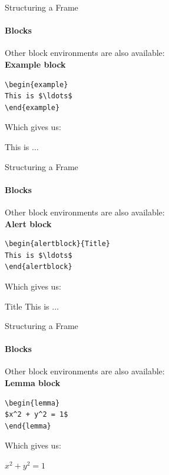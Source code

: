 \documentclass{bredelebeamer}
\begin{document}
\begin{frame}[fragile]{Structuring a Frame}\framesubtitle{Blocks}
Other block environments are also available:\\
\textbf{Example block}	
\begin{center}
\begin{verbatim}
\begin{example}
This is $\ldots$
\end{example}
\end{verbatim}
\end{center}
\alert{Which gives us}:\\
\begin{example}
This is $\ldots$
\end{example}
\end{frame}

\begin{frame}[fragile]{Structuring a Frame}\framesubtitle{Blocks}
Other block environments are also available:\\
\textbf{Alert block}	
\begin{center}
\begin{verbatim}
\begin{alertblock}{Title}
This is $\ldots$
\end{alertblock}
\end{verbatim}
\end{center}
\alert{Which gives us}:\\
\begin{alertblock}{Title}
This is $\ldots$
\end{alertblock}
\end{frame}

\begin{frame}[fragile]{Structuring a Frame}\framesubtitle{Blocks}
Other block environments are also available:\\
\textbf{Lemma block}	
\begin{center}
\begin{verbatim}
\begin{lemma}
$x^2 + y^2 = 1$ 
\end{lemma}
\end{verbatim}
\end{center}
\alert{Which gives us}:\\
\begin{lemma}
$x^2 + y^2 = 1 $
\end{lemma}
\end{frame}
\end{document}
